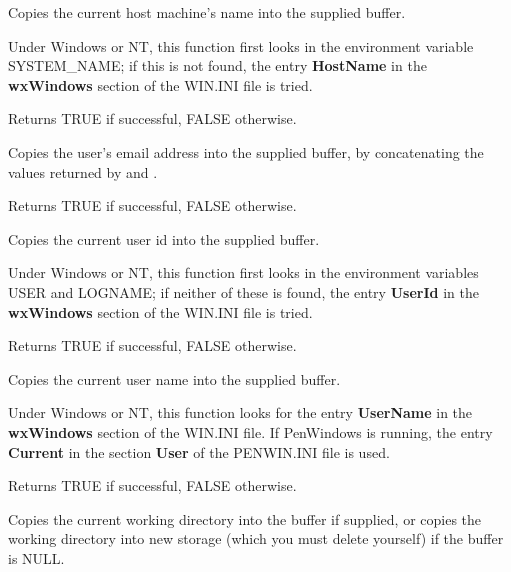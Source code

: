 Copies the current host machine's name into the supplied buffer.

Under Windows or NT, this function first looks in the environment
variable SYSTEM\_NAME; if this is not found, the entry {\bf HostName}\rtfsp
in the {\bf wxWindows} section of the WIN.INI file is tried.

Returns TRUE if successful, FALSE otherwise.

\label{wxgetemailaddress}


Copies the user's email address into the supplied buffer, by
concatenating the values returned by \rtfsp
and .

Returns TRUE if successful, FALSE otherwise.

\label{wxgetuserid}


Copies the current user id into the supplied buffer.

Under Windows or NT, this function first looks in the environment
variables USER and LOGNAME; if neither of these is found, the entry {\bf UserId}\rtfsp
in the {\bf wxWindows} section of the WIN.INI file is tried.

Returns TRUE if successful, FALSE otherwise.

\label{wxgetusername}


Copies the current user name into the supplied buffer.

Under Windows or NT, this function looks for the entry {\bf UserName}\rtfsp
in the {\bf wxWindows} section of the WIN.INI file. If PenWindows
is running, the entry {\bf Current} in the section {\bf User} of
the PENWIN.INI file is used.

Returns TRUE if successful, FALSE otherwise.



Copies the current working directory into the buffer if supplied, or
copies the working directory into new storage (which you must delete yourself)
if the buffer is NULL.

